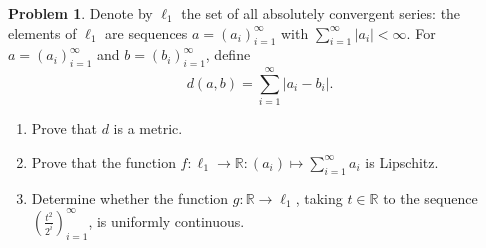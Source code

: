 \documentclass[12pt]{article}
\theoremstyle{definition} %
\newtheorem{problem}{Problem}
\theoremstyle{plain} %
\begin{document}
\begin{problem}
Denote by $\ell_1$ the set of all absolutely convergent series: the elements of $\ell_1$ are sequences $a = (a_i)_{i=1}^{\infty}$ with $\sum_{i=1}^{\infty} |a_i| < \infty$. For $a = (a_i)_{i=1}^{\infty}$ and $b = (b_i)_{i=1}^{\infty}$, define 
\[
d(a,b) = \sum_{i=1}^{\infty} |a_i - b_i|.
\]
\begin{enumerate}
    \item Prove that $d$ is a metric.
    \item Prove that the function $f : \ell_1 \to \mathbb{R}: (a_i) \mapsto \sum_{i=1}^{\infty} a_i$ is Lipschitz.
    \item Determine whether the function $g: \mathbb{R} \to \ell_1$, taking $t \in \mathbb{R}$ to the sequence $\left( \frac{t^2}{2^i} \right)_{i=1}^{\infty}$, is uniformly continuous.
\end{enumerate}
\end{problem}
\end{document}
